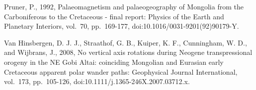\documentclass[11pt]{article}
\begin{document}
Pruner, P., 1992, Palaeomagnetism and palaeogeography of Mongolia from
the Carboniferous to the Cretaceous - final report: Physics of the Earth
and Planetary Interiors, vol.~70, pp.~169-177,
doi:10.1016/0031-9201(92)90179-Y.

Van Hinsbergen, D. J. J., Straathof, G. B., Kuiper, K. F., Cunningham,
W. D., and Wijbrans, J., 2008, No vertical axis rotations during Neogene
transpressional orogeny in the NE Gobi Altai: coinciding Mongolian and
Eurasian early Cretaceous apparent polar wander paths: Geophysical
Journal International, vol.~173, pp.~105-126,
doi:10.1111/j.1365-246X.2007.03712.x.




    
    
    
    
\end{document}
